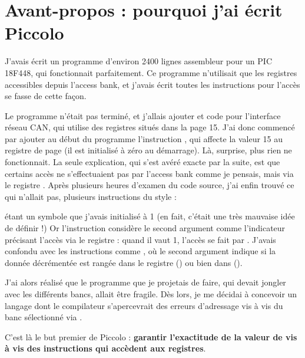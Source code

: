 
\cleardoublepage

\chapter*{Avant-propos : pourquoi j’ai écrit Piccolo}

\thispagestyle{empty}

J’avais écrit un programme d’environ 2400 lignes assembleur pour un PIC 18F448, qui fonctionnait parfaitement. Ce programme n’utilisait que les registres accessibles depuis l’access bank, et j’avais écrit toutes les instructions pour l’accès se fasse de cette façon.

Le programme n’était pas terminé, et j’allais ajouter et code pour l’interface réseau CAN, qui utilise des registres situés dans la page 15. J’ai donc commencé par ajouter au début du programme l’instruction , qui affecte la valeur 15 au registre de page  (il est initialisé à zéro au démarrage). Là, surprise, plus rien ne fonctionnait. La seule explication, qui s’est avéré exacte par la suite, est que certains accès ne s’effectuaient pas par l’access bank comme je pensais, mais via le registre . Après plusieurs heures d’examen du code source, j’ai enfin trouvé ce qui n’allait pas, plusieurs instructions du style :


 étant un symbole que j’avais initialisé à 1 (en fait, c’était une très mauvaise idée de définir  !) Or l’instruction  considère le second argument comme l’indicateur précisant l’accès via le registre  : quand il vaut 1, l’accès se fait par . J’avais confondu avec les instructions comme , où le second argument indique si la donnée décrémentée est rangée dans le registre () ou bien dans  ().

J’ai alors réalisé que le programme que je projetais de faire, qui devait jongler avec les différents bancs, allait être fragile. Dès lors, je me décidai à concevoir un langage dont le compilateur s’apercevrait des erreurs d’adressage vis à vis du banc sélectionné via .

C’est là le but premier de Piccolo : {\bf garantir l’exactitude de la valeur de  vis à vis des instructions qui accèdent aux registres}.


